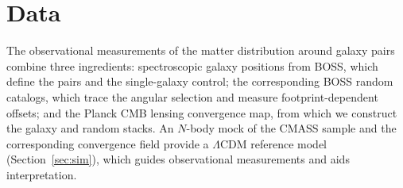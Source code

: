 \documentclass[preprint]{aastex701}
\newcommand{\hinvMpc}{h^{-1}{\rm Mpc}}
\begin{document}

\section{Data}
\label{sec:data}

The observational measurements of the matter distribution around galaxy pairs combine three ingredients: spectroscopic galaxy positions
from BOSS, which define the pairs and the single-galaxy control; the
corresponding BOSS random catalogs, which trace the angular selection and
measure footprint-dependent offsets; and the Planck CMB lensing convergence
map, from which we construct the galaxy and random stacks. An $N$-body mock
of the CMASS sample and the corresponding  convergence field provide a $\Lambda$CDM
reference model
(Section~\ref{sec:sim}), which guides observational measurements and aids interpretation.
\end{document}
